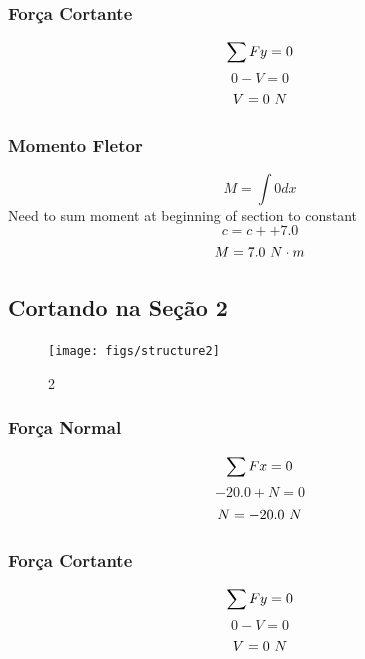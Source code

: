 \documentclass[a4paper,12pt]{article}%
\begin{document}
%
\subsubsection{Força Cortante}%
\label{ssubsec:ForaCortante}%
\begin{dmath*}%
\sum{Fy} = 0 \\%
\end{dmath*}%
\begin{dmath*}%
0 - V = 0%
\end{dmath*}%
\begin{dmath*}%
V = 0$ $N%
\end{dmath*}

%
\subsubsection{Momento Fletor}%
\label{ssubsec:MomentoFletor}%
\begin{dmath*}%
M = \int0 dx%
\end{dmath*}%
Need to sum moment at beginning of section to constant%
\begin{dmath*}%
c = c + +7.0%
\end{dmath*}%
\begin{dmath*}%
M = 7.0$ $N \cdot m%
\end{dmath*}

%
\subsection{Cortando na Seção 2}%
\label{subsec:CortandonaSeo2}%


\begin{figure}[H]%
\centering%
\texttt{[image: figs/structure2]}%
\caption{\label{fig:secoes}\label{fig:secoes} 2}%
\end{figure}

%
\subsubsection{Força Normal}%
\label{ssubsec:ForaNormal}%
\begin{dmath*}%
\sum{Fx} = 0 \\%
\end{dmath*}%
\begin{dmath*}%
-20.0 + N = 0%
\end{dmath*}%
\begin{dmath*}%
N = -20.0$ $N%
\end{dmath*}

%
\subsubsection{Força Cortante}%
\label{ssubsec:ForaCortante}%
\begin{dmath*}%
\sum{Fy} = 0 \\%
\end{dmath*}%
\begin{dmath*}%
0 - V = 0%
\end{dmath*}%
\begin{dmath*}%
V = 0$ $N%
\end{dmath*}
\end{document}
